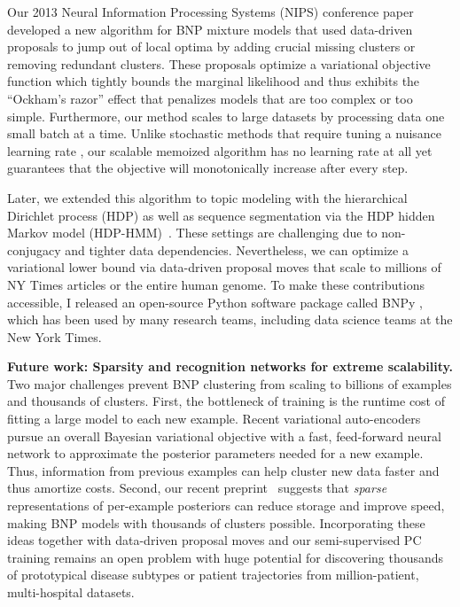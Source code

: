 \documentclass[11pt,letterpaper]{article}
\begin{document}
Our 2013 Neural Information Processing Systems (NIPS) conference paper~\cite{hughes2013moVB} developed a new algorithm for BNP mixture models that used data-driven proposals to jump out of local optima by adding crucial missing clusters or removing redundant clusters. 
These proposals optimize a variational objective function which tightly bounds the marginal likelihood and thus exhibits the ``Ockham's razor'' effect that penalizes models that are too complex or too simple.
Furthermore, our method scales to large datasets by processing data one small batch at a time. Unlike stochastic methods that require tuning a nuisance learning rate \cite{hoffman2013svi}, our scalable memoized algorithm has no learning rate at all yet guarantees that the objective will monotonically increase after every step.

Later, we extended this algorithm to topic modeling with the hierarchical Dirichlet process (HDP) \citep{hughes2015hdpreliable} as well as sequence segmentation via the HDP hidden Markov model (HDP-HMM)~\citep{hughes2015hdphmm}. 
These settings are challenging due to non-conjugacy and tighter data dependencies.
Nevertheless, we can optimize a variational lower bound via data-driven proposal moves that scale to millions of NY Times articles or the entire human genome.
To make these contributions accessible, I released an open-source Python software package called BNPy \citep{hughes2017bnpy}, which has been used by many research teams, including data science teams at the New York Times.

\textbf{Future work: Sparsity and recognition networks for extreme scalability.}
Two major challenges prevent BNP clustering from scaling to billions of examples and thousands of clusters. First, the bottleneck of training is the runtime cost of fitting a large model to each new example. Recent variational auto-encoders
~\citep{kingma2014autoencodingVB,mnih2014neuralVariational} 
pursue an overall Bayesian variational objective with a 
fast, feed-forward neural network to 
approximate the posterior parameters needed for a new example. Thus, information from previous examples can help cluster new data faster and thus amortize costs. 
Second, our recent preprint~\citep{hughes2016sparse} suggests that \emph{sparse} representations of per-example posteriors can reduce storage and improve speed, making BNP models with thousands of clusters possible.
Incorporating these ideas together with data-driven proposal moves and our
semi-supervised PC training remains an open problem with huge potential for 
discovering thousands of prototypical disease subtypes or patient trajectories from million-patient, multi-hospital datasets.
\end{document}
